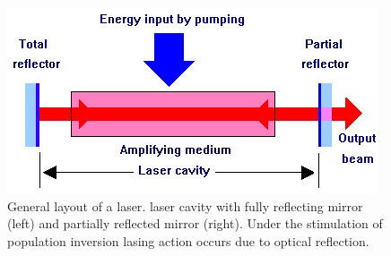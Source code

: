 \begin{figure}[ht!]
\centering
\includegraphics[scale=0.6]{chapters/img/laser_cavity.PNG}
\caption{General layout of a \acs{laser}. \acs{laser} cavity with fully reflecting mirror (left) and partially reflected mirror (right). Under the stimulation of population inversion lasing action occurs due to optical reflection.}
\label{fig:laser_cavity}
\end{figure}

